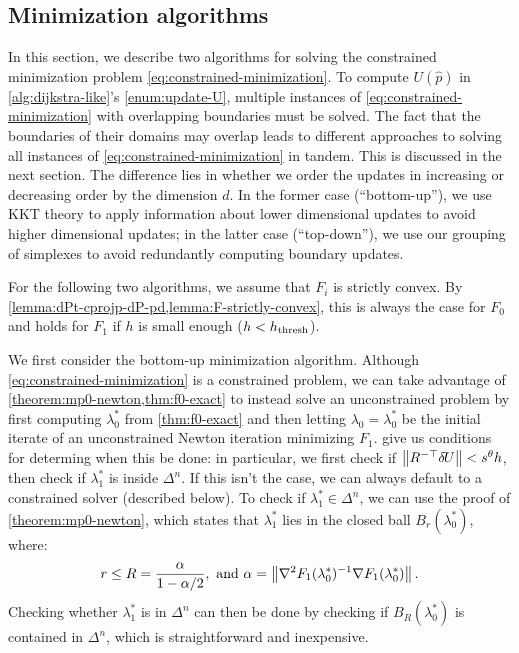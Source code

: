 \documentclass[eikonal.tex]{subfiles}
\begin{document}
\subsection[Optimization algorithms]{Minimization algorithms}

In this section, we describe two algorithms for solving the
constrained minimization problem
\cref{eq:constrained-minimization}. To compute $U(\hat{p})$ in
\cref{alg:dijkstra-like}'s \cref{enum:update-U}, multiple instances of
\cref{eq:constrained-minimization} with overlapping boundaries must be
solved. The fact that the boundaries of their domains may overlap
leads to different approaches to solving all instances of
\cref{eq:constrained-minimization} in tandem. This is discussed in the
next section. The difference lies in whether we order the updates in
increasing or decreasing order by the dimension $d$. In the former
case (``bottom-up''), we use KKT theory to apply information about
lower dimensional updates to avoid higher dimensional updates; in the
latter case (``top-down''), we use our grouping of simplexes to avoid
redundantly computing boundary updates.

For the following two algorithms, we assume that $F_i$ is strictly
convex. By \cref{lemma:dPt-cprojp-dP-pd,lemma:F-strictly-convex}, this
is always the case for $F_0$ and holds for $F_1$ if $h$ is small
enough ($h < h_{\operatorname{thresh}}$).

We first consider the bottom-up minimization algorithm. Although
\cref{eq:constrained-minimization} is a constrained problem, we can
take advantage of \cref{theorem:mp0-newton,thm:f0-exact} to instead
solve an unconstrained problem by first computing $\lambda_0^*$ from
\cref{thm:f0-exact} and then letting $\lambda_0 = \lambda_0^*$ be the
initial iterate of an unconstrained Newton iteration minimizing
$F_1$.  give us conditions for
determing when this be done: in particular, we first check if
$\left\|R^{-\top} {\delta \hspace{-0.09em} U}\right\| < s^\theta h$, then check if $\lambda_1^*$
is inside $\Delta^n$. If this isn't the case, we can always default to
a constrained solver (described below). To check if
$\lambda_1^* \in \Delta^n$, we can use the proof of
\cref{theorem:mp0-newton}, which states that $\lambda_1^*$ lies in the
closed ball $B_r(\lambda_0^*)$, where:
\begin{equation}
  r \leq R = \frac{\alpha}{1 - \alpha/2}, \mbox{ and } \alpha = \left\|\nabla^2 F_1(\lambda_0^*)^{-1} \nabla F_1(\lambda_0^*)\right\|.
\end{equation}
Checking whether $\lambda_1^*$ is in $\Delta^n$ can then be done by
checking if $B_R(\lambda_0^*)$ is contained in $\Delta^n$, which is
straightforward and inexpensive.
\end{document}
